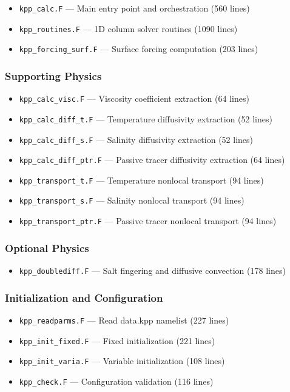 \documentclass[11pt, a4paper]{article}
\begin{document}
\begin{itemize}
    \item \texttt{kpp\_calc.F} — Main entry point and orchestration (560 lines)
    \item \texttt{kpp\_routines.F} — 1D column solver routines (1090 lines)
    \item \texttt{kpp\_forcing\_surf.F} — Surface forcing computation (203 lines)
\end{itemize}

\subsubsection{Supporting Physics}

\begin{itemize}
    \item \texttt{kpp\_calc\_visc.F} — Viscosity coefficient extraction (64 lines)
    \item \texttt{kpp\_calc\_diff\_t.F} — Temperature diffusivity extraction (52 lines)
    \item \texttt{kpp\_calc\_diff\_s.F} — Salinity diffusivity extraction (52 lines)
    \item \texttt{kpp\_calc\_diff\_ptr.F} — Passive tracer diffusivity extraction (64 lines)
    \item \texttt{kpp\_transport\_t.F} — Temperature nonlocal transport (94 lines)
    \item \texttt{kpp\_transport\_s.F} — Salinity nonlocal transport (94 lines)
    \item \texttt{kpp\_transport\_ptr.F} — Passive tracer nonlocal transport (94 lines)
\end{itemize}

\subsubsection{Optional Physics}

\begin{itemize}
    \item \texttt{kpp\_doublediff.F} — Salt fingering and diffusive convection (178 lines)
\end{itemize}

\subsubsection{Initialization and Configuration}

\begin{itemize}
    \item \texttt{kpp\_readparms.F} — Read data.kpp namelist (227 lines)
    \item \texttt{kpp\_init\_fixed.F} — Fixed initialization (221 lines)
    \item \texttt{kpp\_init\_varia.F} — Variable initialization (108 lines)
    \item \texttt{kpp\_check.F} — Configuration validation (116 lines)
\end{itemize}
\end{document}
